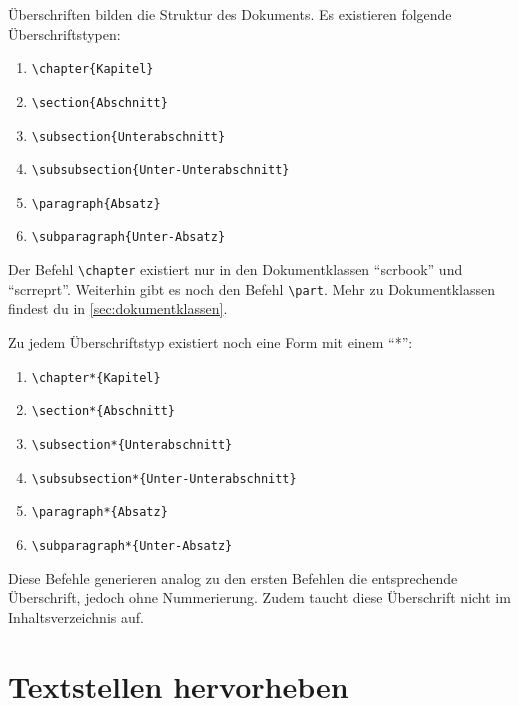 Überschriften bilden die Struktur des Dokuments. Es existieren folgende Überschriftstypen:

\begin{enumerate}
	\item \texttt{\textbackslash chapter\{Kapitel\}}
	\item \texttt{\textbackslash section\{Abschnitt\}}
	\item \texttt{\textbackslash subsection\{Unterabschnitt\}}
	\item \texttt{\textbackslash subsubsection\{Unter-Unterabschnitt\}}
	\item \texttt{\textbackslash paragraph\{Absatz\}}
	\item \texttt{\textbackslash subparagraph\{Unter-Absatz\}}
\end{enumerate}

Der Befehl \texttt{\textbackslash chapter} existiert nur in den Dokumentklassen \enquote{scrbook} und \enquote{scrreprt}. Weiterhin gibt es noch den Befehl \texttt{\textbackslash part}. Mehr zu Dokumentklassen findest du in \cref{sec:dokumentklassen}.

Zu jedem Überschriftstyp existiert noch eine Form mit einem \enquote{*}:

\begin{enumerate}
	\item \texttt{\textbackslash chapter*\{Kapitel\}}
	\item \texttt{\textbackslash section*\{Abschnitt\}}
	\item \texttt{\textbackslash subsection*\{Unterabschnitt\}}
	\item \texttt{\textbackslash subsubsection*\{Unter-Unterabschnitt\}}
	\item \texttt{\textbackslash paragraph*\{Absatz\}}
	\item \texttt{\textbackslash subparagraph*\{Unter-Absatz\}}
\end{enumerate}

Diese Befehle generieren analog zu den ersten Befehlen die entsprechende Überschrift, jedoch ohne Nummerierung. Zudem taucht diese Überschrift nicht im Inhaltsverzeichnis auf.




\section{Textstellen hervorheben}

